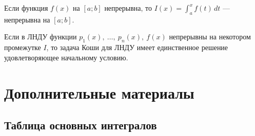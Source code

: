 \begin{theorem}[Непрерывность $I(x)$]
    Если функция $f(x)$ на $[a;b]$ непрерывна, то $I(x) = \int_{a}^{x} f(t)\, dt$ --- непрерывна на $[a;b]$.
\end{theorem}

\begin{theorem}
    Если в ЛНДУ функции $p_1(x),\ \ldots,\ p_n(x),\ f(x)$ непрерывны на некотором промежутке $I$, то задача Коши для ЛНДУ имеет единственное решение удовлетворяющее начальному условию.
\end{theorem}

\section{Дополнительные материалы}

\subsection{Таблица основных интегралов}

